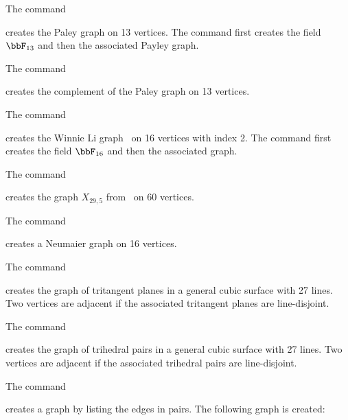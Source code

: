 \bigskip

The command 


creates the Paley graph on 13 vertices. 
The command first creates the field $\bbF_{13}$ 
and then the associated Payley graph.

\bigskip

The command 


creates the complement of the Paley graph on 13 vertices. 

\bigskip

The command 


creates the Winnie Li graph~\cite{Li1992} 
on 16 vertices with index 2.
The command first creates the field $\bbF_{16}$ 
and then the associated graph.

\bigskip


The command 


creates the graph $X_{29,5}$ from~\cite{Lubotzky1988} on 60 vertices.

\bigskip



The command 


creates a Neumaier graph on 16 vertices.

\bigskip

The command 


creates the graph of tritangent planes in a general cubic surface with 27 lines. 
Two vertices are adjacent if the associated tritangent planes are line-disjoint.


\bigskip


The command 


creates the graph of trihedral pairs in a general cubic surface with 27 lines. 
Two vertices are adjacent if the associated trihedral pairs are line-disjoint.


\bigskip


The command 


creates a graph by listing the edges in pairs. 
The following graph is created:



